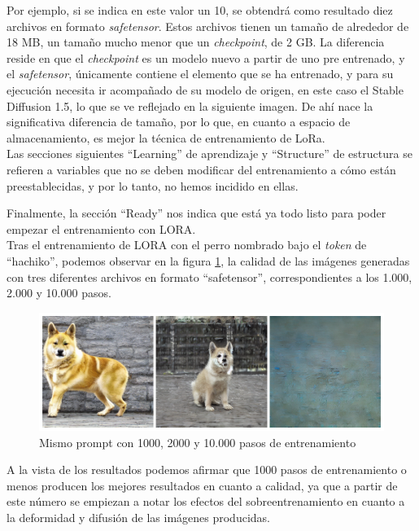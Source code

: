 Por ejemplo, si se indica en este valor un 10, se obtendrá como resultado diez archivos en formato \textit{safetensor}. Estos archivos tienen un tamaño de alrededor de 18 MB, un tamaño mucho menor que un \textit{checkpoint}, de 2 GB. La diferencia reside en que el \textit{checkpoint} es un modelo nuevo a partir de uno pre entrenado, y el \textit{safetensor}, únicamente contiene el elemento que se ha entrenado, y para su ejecución necesita ir acompañado de su modelo de origen, en este caso el Stable Diffusion 1.5, lo que se ve reflejado en la siguiente imagen. De ahí nace la significativa diferencia de tamaño, por lo que, en cuanto a espacio de almacenamiento, es mejor la técnica de entrenamiento de LoRa. \\


Las secciones siguientes ``Learning'' de aprendizaje y ``Structure'' de estructura se refieren a variables que no se deben modificar del entrenamiento a cómo están preestablecidas, y por lo tanto, no hemos incidido en ellas.

Finalmente, la sección ``Ready'' nos indica que está ya todo listo para poder empezar el entrenamiento con LORA. \\

Tras el entrenamiento de LORA con el perro nombrado bajo el \textit{token} de ``hachiko'', podemos observar en la figura \ref{fig:comphachi}, la calidad de las imágenes generadas con tres diferentes archivos en formato ``safetensor'', correspondientes a los 1.000, 2.000 y 10.000 pasos. 

\begin{figure}[!htb]
	\centering
	\includegraphics[width = 1
	\textwidth]{Imagenes/Vectorial/comparacion_hachiko.png}
	\caption{Mismo prompt con 1000, 2000 y 10.000 pasos de entrenamiento}
	\label{fig:comphachi}
\end{figure}

A la vista de los resultados podemos afirmar que 1000 pasos de entrenamiento o menos producen los mejores resultados en cuanto a calidad, ya que a partir de este número se empiezan a notar los efectos del sobreentrenamiento en cuanto a la deformidad y difusión de las imágenes producidas.


